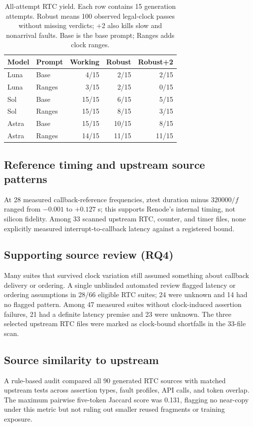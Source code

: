 \documentclass[sigconf,nonacm]{acmart}
\begin{document}
\begin{table}[t]
\caption{All-attempt RTC yield. Each row contains 15 generation attempts. Robust means 100 observed legal-clock passes without missing verdicts; +2 also kills slow and nonarrival faults. Base is the base prompt; Ranges adds clock ranges.}
\label{tab:yield}\scriptsize
\begin{tabular}{@{}llrrr@{}}\toprule
Model & Prompt & Working & Robust & Robust+2 \\ \midrule
Luna & Base & 4/15 & 2/15 & 2/15 \\
Luna & Ranges & 3/15 & 2/15 & 0/15 \\
Sol & Base & 15/15 & 6/15 & 5/15 \\
Sol & Ranges & 15/15 & 8/15 & 3/15 \\
Astra & Base & 15/15 & 10/15 & 8/15 \\
Astra & Ranges & 14/15 & 11/15 & 11/15 \\
\bottomrule\end{tabular}
\end{table}

\subsection{Reference timing and upstream source patterns}
At 28 measured callback-reference frequencies, ztest duration minus $320000/f$ ranged from $-0.001$ to $+0.127$ s; this supports Renode's internal timing, not silicon fidelity. Among 33 scanned upstream RTC, counter, and timer files, none explicitly measured interrupt-to-callback latency against a registered bound.

\subsection{Supporting source review (RQ4)}
Many suites that survived clock variation still assumed something about callback delivery or ordering. A single unblinded automated review flagged latency or ordering assumptions in 28/66 eligible RTC suites; 24 were unknown and 14 had no flagged pattern. Among 47 measured suites without clock-induced assertion failures, 21 had a definite latency premise and 23 were unknown. The three selected upstream RTC files were marked as clock-bound shortfalls in the 33-file scan.

\subsection{Source similarity to upstream}
A rule-based audit compared all 90 generated RTC sources with matched upstream tests across assertion types, fault profiles, API calls, and token overlap. The maximum pairwise five-token Jaccard score was 0.131, flagging no near-copy under this metric but not ruling out smaller reused fragments or training exposure.
\end{document}
